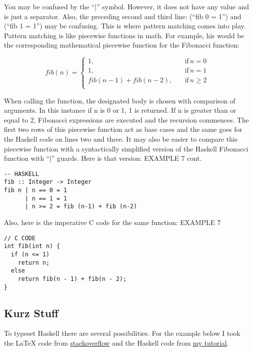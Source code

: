 \documentclass{article}
\begin{document}
\medskip\noindent
You may be confused by the “|” symbol. However, it does not have any value and is just a separator. Also, the preceding second and third line: (“fib 0 = 1”) and (“fib 1 = 1”) may be confusing. This is where pattern matching comes into play. Pattern matching is like piecewise functions in math. For example, his would be the corresponding mathematical piecewise function for the Fibonacci function:

\begin{equation*}
fib(n)=\begin{cases}
          1, \quad &\text{if} \, n = 0 \\
          1, \quad &\text{if} \, n = 1 \\
          fib(n-1)+fib(n-2), \quad &\text{if} \, n \geq 2 \\
      \end{cases}
\end{equation*}

\medskip\noindent
When calling the function, the designated body is chosen with comparison of arguments. In this instance if n is 0 or 1, 1 is returned. If n is greater than or equal to 2, Fibonacci expressions are executed and the recursion commences. The first two rows of this piecewise function act as base cases and the same goes for the Haskell code on lines two and three. It may also be easier to compare this piecewise function with a syntactically simplified version of the Haskell Fibonacci function with “|” guards. Here is that version: EXAMPLE 7 cont.

\begin{lstlisting}[style=HaskellStyle]
-- HASKELL
fib :: Integer -> Integer
fib n | n == 0 = 1
      | n == 1 = 1
      | n >= 2 = fib (n-1) + fib (n-2)
\end{lstlisting}

\medskip\noindent
Also, here is the imperative C code for the same function: EXAMPLE 7

\begin{lstlisting}[style=CStyle]
// C CODE
int fib(int n) {
  if (n <= 1)
    return n;
  else
    return fib(n - 1) + fib(n - 2);
}
\end{lstlisting}

\subsection{Kurz Stuff}
\medskip\noindent
To typeset Haskell there are several possibilities. For the example below I took the LaTeX code from \href{https://stackoverflow.com/a/3175141/4600290}{stackoverflow} and the Haskell code from \href{https://hackmd.io/@alexhkurz/HylLKujCP}{my tutorial}.
\end{document}
